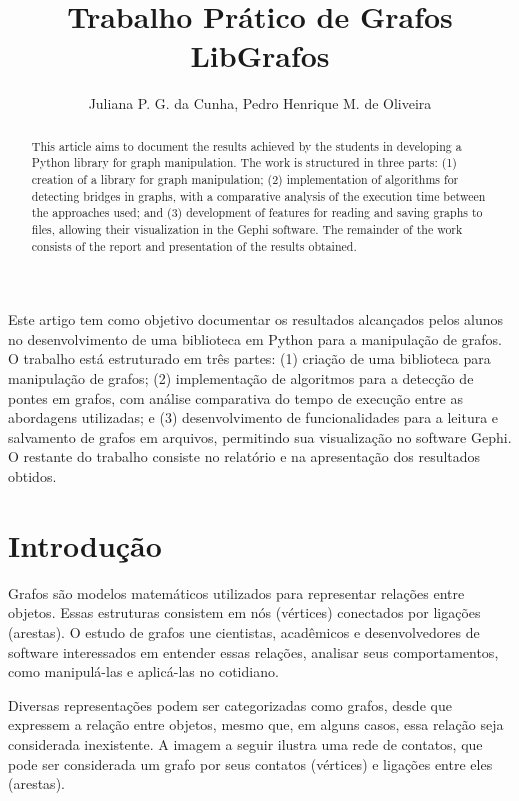 \documentclass[12pt]{article}
\title{Trabalho Prático de Grafos\\ LibGrafos}
\author{Juliana P. G. da Cunha\inst{1}, Pedro Henrique M. de Oliveira\inst{2}}
\begin{document}
 

\maketitle

\begin{abstract}
  This article aims to document the results achieved by the students in developing a Python library for graph manipulation. The work is structured in three parts: (1) creation of a library for graph manipulation; (2) implementation of algorithms for detecting bridges in graphs, with a comparative analysis of the execution time between the approaches used; and (3) development of features for reading and saving graphs to files, allowing their visualization in the Gephi software. The remainder of the work consists of the report and presentation of the results obtained.
\end{abstract}
     
\begin{resumo} 
Este artigo tem como objetivo documentar os resultados alcançados pelos alunos no desenvolvimento de uma biblioteca em Python para a manipulação de grafos. O trabalho está estruturado em três partes: (1) criação de uma biblioteca para manipulação de grafos; (2) implementação de algoritmos para a detecção de pontes em grafos, com análise comparativa do tempo de execução entre as abordagens utilizadas; e (3) desenvolvimento de funcionalidades para a leitura e salvamento de grafos em arquivos, permitindo sua visualização no software Gephi. O restante do trabalho consiste no relatório e na apresentação dos resultados obtidos.
\end{resumo}

\section{Introdução}

Grafos são modelos matemáticos utilizados para representar relações entre objetos. Essas estruturas consistem em nós (vértices) conectados por ligações (arestas). O estudo de grafos une cientistas, acadêmicos e desenvolvedores de software interessados em entender essas relações, analisar seus comportamentos, como manipulá-las e aplicá-las no cotidiano.

Diversas representações podem ser categorizadas como grafos, desde que expressem a relação entre objetos, mesmo que, em alguns casos, essa relação seja considerada inexistente. A imagem a seguir ilustra uma rede de contatos, que pode ser considerada um grafo por seus contatos (vértices) e ligações entre eles (arestas).
\end{document}
